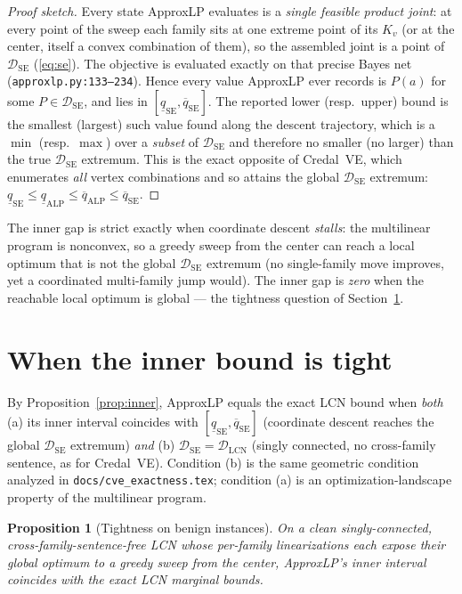 \documentclass[11pt]{article}
\newtheorem{proposition}{Proposition}
\newcommand{\lo}{\underline}
\newcommand{\hi}{\overline}
\newcommand{\DSE}{\mathcal{D}_{\mathrm{SE}}}
\newcommand{\DLCN}{\mathcal{D}_{\mathrm{LCN}}}
\begin{document}
\begin{proof}[Proof sketch]
Every state ApproxLP evaluates is a \emph{single feasible product joint}: at every point of the
sweep each family sits at one extreme point of its $K_v$ (or at the center, itself a convex
combination of them), so the assembled joint is a point of $\DSE$ (\eqref{eq:se}). The objective is
evaluated exactly on that precise Bayes net (\texttt{approxlp.py:133--234}). Hence every value
ApproxLP ever records is $P(a)$ for some $P\in\DSE$, and lies in $[\lo q_{\mathrm{SE}},\hi
q_{\mathrm{SE}}]$. The reported lower (resp.\ upper) bound is the smallest (largest) such value found
along the descent trajectory, which is a $\min$ (resp.\ $\max$) over a \emph{subset} of $\DSE$ and
therefore no smaller (no larger) than the true $\DSE$ extremum. This is the exact opposite of
Credal~VE, which enumerates \emph{all} vertex combinations and so attains the global $\DSE$
extremum: $\lo q_{\mathrm{SE}}\le\lo q_{\mathrm{ALP}}\le\hi q_{\mathrm{ALP}}\le\hi q_{\mathrm{SE}}$.
\end{proof}

\noindent The inner gap is strict exactly when coordinate descent \emph{stalls}: the multilinear
program is nonconvex, so a greedy sweep from the center can reach a local optimum that is not the
global $\DSE$ extremum (no single-family move improves, yet a coordinated multi-family jump would).
The inner gap is \emph{zero} when the reachable local optimum is global --- the tightness question of
Section~\ref{sec:tight}.

\section{When the inner bound is tight}\label{sec:tight}

By Proposition~\ref{prop:inner}, ApproxLP equals the exact LCN bound when \emph{both} (a) its inner
interval coincides with $[\lo q_{\mathrm{SE}},\hi q_{\mathrm{SE}}]$ (coordinate descent reaches the
global $\DSE$ extremum) \emph{and} (b) $\DSE=\DLCN$ (singly connected, no cross-family sentence, as
for Credal~VE). Condition (b) is the same geometric condition analyzed in
\texttt{docs/cve\_exactness.tex}; condition (a) is an optimization-landscape property of the
multilinear program.

\begin{proposition}[Tightness on benign instances]\label{prop:tight}
On a clean singly-connected, cross-family-sentence-free LCN whose per-family linearizations each
expose their global optimum to a greedy sweep from the center, ApproxLP's inner interval coincides
with the exact LCN marginal bounds.
\end{proposition}
\end{document}
